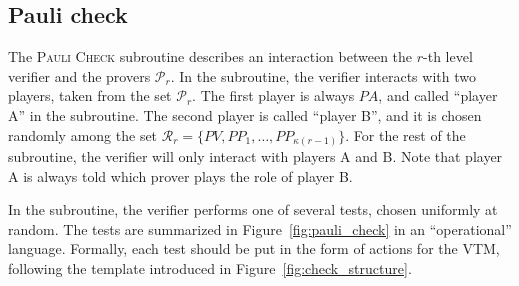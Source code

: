 
\subsection{Pauli check}
\label{sec:pauli_check}

The \textsc{Pauli Check} subroutine describes an interaction between the $r$-th level verifier and the provers $\mathcal{P}_r$. In the subroutine, the verifier interacts with two players, taken from the set $\mathcal{P}_r$. The first player is always $PA$, and called ``player A'' in the subroutine. The second player is called ``player B'', and it is chosen randomly among the set $\mathcal{R}_r = \{ PV, PP_1,\ldots,PP_{\kappa(r-1)}\}$. For the rest of the subroutine, the verifier will only interact with players A and B. Note that player A is always told which prover plays the role of player B.  

In the subroutine, the verifier performs one of several tests, chosen uniformly at random. The tests are summarized in Figure~\ref{fig:pauli_check} in an ``operational'' language. Formally, each test should be put in the form of actions for the VTM, following the template introduced in Figure~\ref{fig:check_structure}. 

